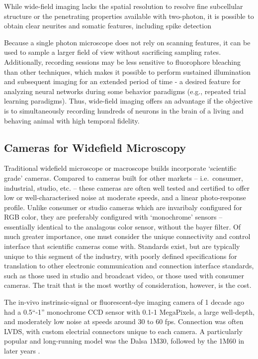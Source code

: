 While wide-field imaging lacks the spatial resolution to resolve fine subcellular structure or the penetrating properties available with two-photon, it is possible to obtain clear neurites and somatic features, including spike detection

Because a single photon microscope does not rely on scanning features, it can be used to sample a larger field of view without sacrificing sampling rates.
Additionally, recording sessions may be less sensitive to fluorophore bleaching than other techniques, which makes it possible to perform sustained illumination and subsequent imaging for an extended period of time - a desired feature for analyzing neural networks during some behavior paradigms (e.g., repeated trial learning paradigms).
Thus, wide-field imaging offers an advantage if the objective is to simultaneously recording hundreds of neurons in the brain of a living and behaving animal with high temporal fidelity.

\subsection{Cameras for Widefield Microscopy}\label{sec:cameras-for-widefield-microscopy}

Traditional widefield microscope or macroscope builds incorporate `scientific grade' cameras.
Compared to cameras built for other markets -- i.e.~consumer, industrial, studio, etc. -- these cameras are often well tested and certified to offer low or well-characterised noise at moderate speeds, and a linear photo-response profile.
Unlike consumer or studio cameras which are invaribaly configured for RGB color, they are preferably configured with `monochrome' sensors -- essentially identical to the analagous color sensor, without the bayer filter.
Of much greater importance, one must consider the unique connectivity and control interface that scientific cameras come with.
Standards exist, but are typically unique to this segment of the industry, with poorly defined specifications for translation to other electronic communication and connection interface standards, such as those used in studio and broadcast video, or those used with consumer cameras.
The trait that is the most worthy of consideration, however, is the cost.

The in-vivo instrinsic-signal or fluorescent-dye imaging camera of 1 decade ago had a 0.5``-1'' monochrome CCD sensor with 0.1-1 MegaPixels, a large well-depth, and moderately low noise at speeds around 30 to 60 fps.
Connection was often LVDS, with custom electrial connectors unique to each camera.
A particularly popular and long-running model was the Dalsa 1M30, followed by the 1M60 in later years \cite{takahashi_vivo_2006}.

